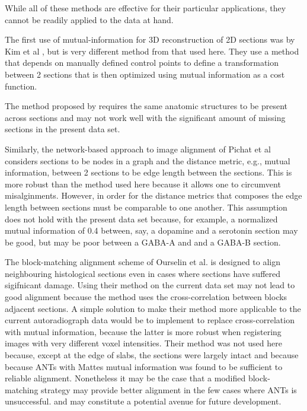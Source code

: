 \documentclass[12pt]{article}
\begin{document}
While all of these methods are effective for their particular applications, they cannot be readily applied to the data at hand. 

The first use of mutual-information for 3D reconstruction of 2D sections was by Kim et al \cite{Kim1997}, but is very different method from that used here. They use a method that depends on manually defined control points to define a transformation between 2 sections that is then optimized using mutual information as a cost function. 

The method proposed by \cite{Cifor2011} requires the same anatomic structures to be present across sections and may not work well with the significant amount of missing sections in the present data set. 

Similarly, the network-based approach to image alignment of Pichat et al \cite{Pichat2015} considers sections to be nodes in a graph and the distance metric, e.g., mutual information, between 2 sections to be edge length between the sections. This is more robust than the method used here because it allows one to circumvent misalginments.  However, in order for the distance metrics that composes the edge length between sections must be comparable to one another. This assumption does not hold with the present data set because, for example, a normalized mutual information of 0.4 between, say, a dopamine and a serotonin section may be good, but may be poor between a GABA-A and and a GABA-B section.  


The block-matching alignment scheme of Ourselin et al. \cite{Oureselin2001} is designed to align neighbouring histological sections even in cases where sections have suffered sigifnicant damage. Using their method on the current data set may not lead to good alignment because the method uses the cross-correlation between blocks adjacent sections. A simple solution to make their method more applicable to the current autoradiograph data would be to implement to replace cross-correlation with mutual information, because the latter is more robust when registering images with very different voxel intensities. Their method was not used here because, except at the edge of slabs, the sections were largely intact and because because ANTs with Mattes mutual information was found to be sufficient to reliable alignment. Nonetheless it may be the case that a modified block-matching strategy may provide better alignment  in the few cases where ANTs is unsuccessful. and may constitute a potential avenue for future development. 
\end{document}
